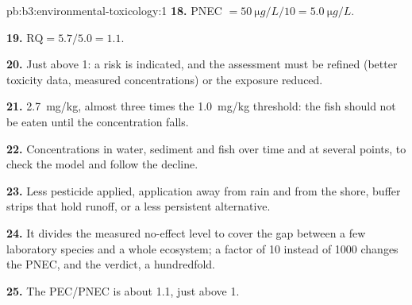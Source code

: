 \begin{solution}{pb:b3:environmental-toxicology:1}
\textbf{18.} PNEC $= \qty{50}{\micro g/L}/10 = \qty{5.0}{\micro g/L}$.

\textbf{19.} $\mathrm{RQ} = 5.7/5.0 = 1.1$.

\textbf{20.} Just above 1: a risk is indicated, and the assessment must be refined (better
toxicity data, measured concentrations) or the exposure reduced.

\textbf{21.} \qty{2.7}{mg/kg}, almost three times the \qty{1.0}{mg/kg} threshold: the fish should not be eaten
until the concentration falls.

\textbf{22.} Concentrations in water, sediment and fish over time and at several points,
to check the model and follow the decline.

\textbf{23.} Less pesticide applied, application away from rain and from the shore,
buffer strips that hold runoff, or a less persistent alternative.

\textbf{24.} It divides the measured no-effect level to cover the gap between a few
laboratory species and a whole ecosystem; a factor of 10 instead of 1000 changes the
PNEC, and the verdict, a hundredfold.

\textbf{25.} The  PEC/PNEC is about 1.1, just above 1.
\end{solution}
